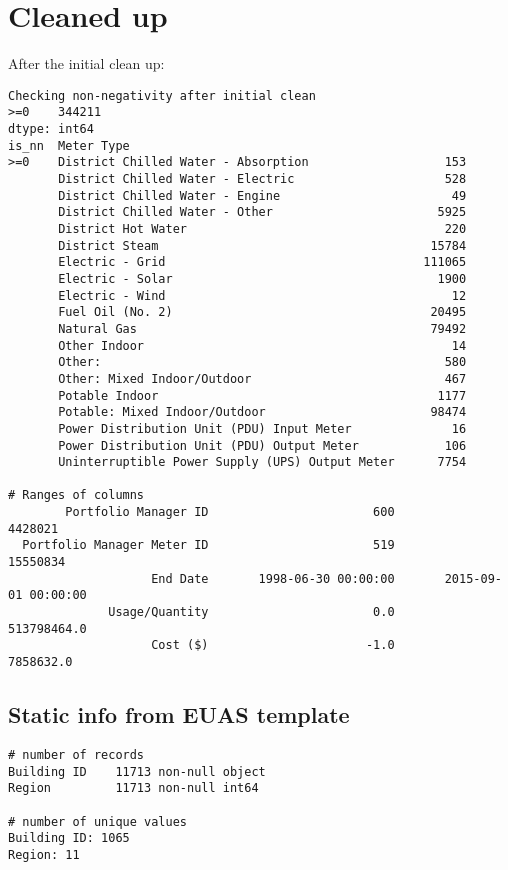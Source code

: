 \documentclass[12pt]{article}
\begin{document}
\section{Cleaned up}
After the initial clean up:
\begin{verbatim}
Checking non-negativity after initial clean
>=0    344211
dtype: int64
is_nn  Meter Type                                     
>=0    District Chilled Water - Absorption                   153
       District Chilled Water - Electric                     528
       District Chilled Water - Engine                        49
       District Chilled Water - Other                       5925
       District Hot Water                                    220
       District Steam                                      15784
       Electric - Grid                                    111065
       Electric - Solar                                     1900
       Electric - Wind                                        12
       Fuel Oil (No. 2)                                    20495
       Natural Gas                                         79492
       Other Indoor                                           14
       Other:                                                580
       Other: Mixed Indoor/Outdoor                           467
       Potable Indoor                                       1177
       Potable: Mixed Indoor/Outdoor                       98474
       Power Distribution Unit (PDU) Input Meter              16
       Power Distribution Unit (PDU) Output Meter            106
       Uninterruptible Power Supply (UPS) Output Meter      7754

# Ranges of columns
        Portfolio Manager ID                       600                   4428021
  Portfolio Manager Meter ID                       519                  15550834
                    End Date       1998-06-30 00:00:00       2015-09-01 00:00:00
              Usage/Quantity                       0.0               513798464.0
                    Cost ($)                      -1.0                 7858632.0

\end{verbatim}
\subsection{Static info from EUAS template}
\begin{verbatim}
# number of records
Building ID    11713 non-null object
Region         11713 non-null int64

# number of unique values
Building ID: 1065
Region: 11
\end{verbatim}
\end{document}

